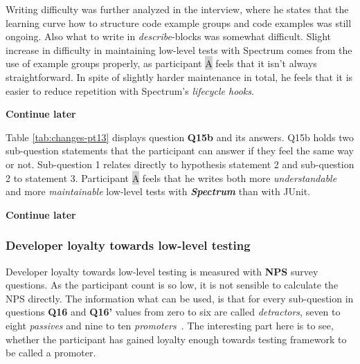Writing difficulty was further analyzed in
the interview, where he states that the learning curve how to structure code example groups and code examples was still ongoing.
Also what to write in \textit{describe}-blocks was somewhat difficult. Slight increase in difficulty in maintaining low-level
tests with Spectrum comes from the use of example groups properly, as participant {\colorbox{lightgray}A} feels that it
isn't always straightforward. In spite of slightly harder maintenance in total, he feels that it is easier to reduce repetition
with Spectrum's \textit{lifecycle hooks}.

\textbf{Continue later}

Table \ref{tab:changes-pt13} displays question \textbf{Q15b} and its answers. Q15b holds two sub-question statements that the participant can answer
if they feel the same way or not. Sub-question 1 relates directly to hypothesis statement 2 and sub-question 2 to
statement 3. Participant {\colorbox{lightgray}A} feels that he writes both more \textit{understandable} and more \textit{maintainable} low-level
tests with \textbf{\textit{Spectrum}} than with JUnit.

\textbf{Continue later}

    \begin{table}[H]
            \caption {Developer perception towards \textit{Spectrum/Spock}} \label{tab:changes-pt13}

    \end{table}


\subsubsection{Developer loyalty towards low-level testing}
Developer loyalty towards low-level testing is measured with \textbf{NPS} survey questions. As the participant count is so low, it is not
sensible to calculate the NPS directly. The information what can be used, is that for every sub-question in questions
\textbf{Q16} and \textbf{Q16'} values from zero to six are called \textit{detractors}, seven to eight \textit{passives} and
nine to ten \textit{promoters}~\cite{reichheld2003one}. The interesting part here is to see, whether the participant has gained loyalty enough
towards testing framework to be called a promoter.

